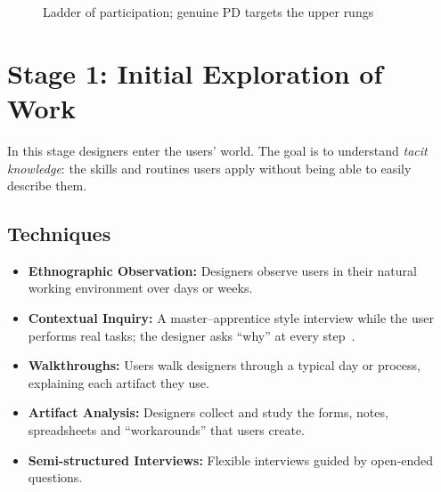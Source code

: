 \documentclass[a4paper,12pt]{article}
\begin{document}
\begin{figure}[H]
\centering
{}
\caption{Ladder of participation; genuine PD targets the upper rungs}
\label{fig:ladder}
\end{figure}

\section{Stage 1: Initial Exploration of Work}
In this stage designers enter the users' world. The goal is to understand \emph{tacit knowledge}: the skills and routines users apply without being able to easily describe them.

\subsection{Techniques}
\begin{itemize}
    \item \textbf{Ethnographic Observation:} Designers observe users in their natural working environment over days or weeks.
    \item \textbf{Contextual Inquiry:} A master--apprentice style interview while the user performs real tasks; the designer asks ``why'' at every step~\cite{beyer1998}.
    \item \textbf{Walkthroughs:} Users walk designers through a typical day or process, explaining each artifact they use.
    \item \textbf{Artifact Analysis:} Designers collect and study the forms, notes, spreadsheets and ``workarounds'' that users create.
    \item \textbf{Semi-structured Interviews:} Flexible interviews guided by open-ended questions.
\end{itemize}
\end{document}
